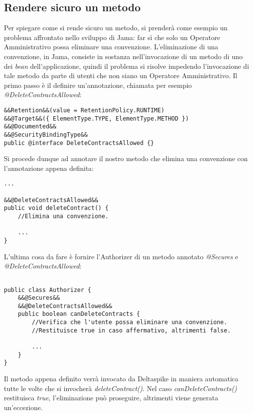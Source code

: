 \subsection{Rendere sicuro un metodo}
Per spiegare come si rende sicuro un metodo, si prenderà come esempio un problema affrontato nello sviluppo di Jama: far sì che solo un Operatore Amministrativo possa eliminare una convenzione. L'eliminazione di una convenzione, in Jama, consiste in sostanza nell'invocazione di un metodo di uno dei \textit{bean} dell'applicazione, quindi il problema si risolve impedendo l'invocazione di tale metodo da parte di utenti che non siano un Operatore Amministrativo.\newline
Il primo passo è il definire un'annotazione, chiamata per esempio \textsl{@DeleteContractsAllowed}:

\begin{lstlisting}
&&Retention&&(value = RetentionPolicy.RUNTIME)
&&@Target&&({ ElementType.TYPE, ElementType.METHOD })
&&@Documented&&
&&@SecurityBindingType&&
public @interface DeleteContractsAllowed {}
\end{lstlisting}

Si procede dunque ad annotare il nostro metodo che elimina una convenzione con l'annotazione appena definita:

\begin{lstlisting}
...

&&@DeleteContractsAllowed&&
public void deleteContract() {
	//Elimina una convenzione.
	
	...
}
\end{lstlisting}

L'ultima cosa da fare è fornire l'Authorizer di un metodo annotato \textsl{@Secures} e \textsl{@DeleteContractsAllowed}:

\begin{lstlisting}

public class Authorizer {
	&&@Secures&&
	&&@DeleteContractsAllowed&&
	public boolean canDeleteContracts {
		//Verifica che l'utente possa eliminare una convenzione.
		//Restituisce true in caso affermativo, altrimenti false.
	
		...
	}
}
\end{lstlisting}

Il metodo appena definito verrà invocato da Deltaspike in maniera automatica tutte le volte che si invocherà \textsl{deleteContract()}. Nel caso \textsl{canDeleteContracts()} restituisca \textsl{true}, l'eliminazione può proseguire, altrimenti viene generata un'eccezione.

